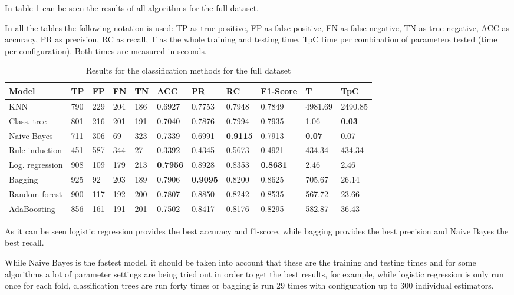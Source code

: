 \documentclass[a4paper,11pt]{article}
\begin{document}
In table \ref{class:full} can be seen the results of all algorithms for the full dataset.

In all the tables the following notation is used: TP as true positive, FP as false positive, FN as false negative, TN as true negative, ACC as accuracy, PR as precision, RC as recall, T as the whole training and testing time, TpC time per combination of parameters tested (time per configuration). Both times are measured in seconds.

\begin{table}
\centering

\begin{tabular}{|l|l|l|l|l|l|l|l|l|l|l|}
\hline

\textbf{Model} & \textbf{TP} & \textbf{FP} & \textbf{FN} & \textbf{TN} & \textbf{ACC} & \textbf{PR} & \textbf{RC} & \textbf{F1-Score} & \textbf{T} & \textbf{TpC} \\ \hline
KNN & 790 & 229 & 204 & 186 & 0.6927 & 0.7753 & 0.7948 & 0.7849 & 4981.69 & 2490.85 \\ \hline
Class. tree & 801 & 216 & 201 & 191 & 0.7040 & 0.7876 & 0.7994 & 0.7935 & 1.06 & \textbf{0.03} \\ \hline
Naive Bayes & 711 & 306 & 69 & 323 & 0.7339 & 0.6991 & \textbf{0.9115} & 0.7913 & \textbf{0.07} & 0.07 \\ \hline
Rule induction & 451 & 587 & 344 & 27 & 0.3392 & 0.4345 & 0.5673 & 0.4921 & 434.34 & 434.34 \\ \hline
Log. regression & 908 & 109 & 179 & 213 & \textbf{0.7956} & 0.8928 & 0.8353 & \textbf{0.8631} & 2.46 & 2.46 \\ \hline
Bagging & 925 & 92 & 203 & 189 & 0.7906 & \textbf{0.9095} & 0.8200 & 0.8625 & 705.67 & 26.14 \\ \hline
Random forest & 900 & 117 & 192 & 200 & 0.7807 & 0.8850 & 0.8242 & 0.8535 & 567.72 & 23.66 \\ \hline
AdaBoosting & 856 & 161 & 191 & 201 & 0.7502 & 0.8417 & 0.8176 & 0.8295 & 582.87 & 36.43 \\ \hline

\end{tabular}
\caption{Results for the classification methods for the full dataset}
\label{class:full}
\end{table}

As it can be seen logistic regression provides the best accuracy and f1-score, while bagging provides the best precision and Naive Bayes the best recall. 

While Naive Bayes is the fastest model, it should be taken into account that these are the training and testing times and for some algorithms a lot of parameter settings are being tried out in order to get the best results, for example, while logistic regression is only run once for each fold, classification trees are run forty times or bagging is run 29 times with configuration up to 300 individual estimators.
\end{document}
